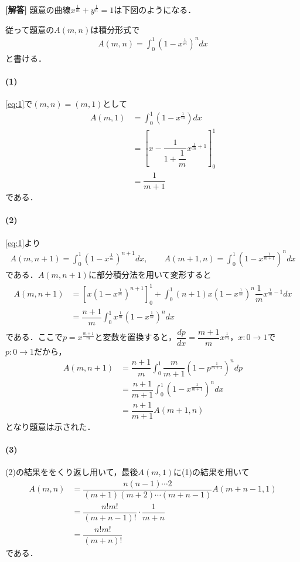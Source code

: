 \documentclass[../../main.tex]{subfiles}
\begin{document}
\begin{oframed}
  
\end{oframed}

{\bf [解答]}
題意の曲線$x^{\frac{1}{m}}+y^{\frac{1}{n}}=1$は下図のようになる．

従って題意の$A(m,n)$は積分形式で
\begin{align}
  A(m,n)=\int_0^1\left(1-x^{\frac{1}{m}}\right)^ndx \label{eq:1}
\end{align}
と書ける．

\paragraph{(1)}

\cref{eq:1}で$(m,n)=(m,1)$として
\begin{align}
  A(m,1)
  &=\int_0^1\left(1-x^{\frac{1}{m}}\right)dx \\
  &=\left[x-\dfrac{1}{1+\dfrac{1}{m}}x^{\frac{1}{m}+1}\right]_0^1 \\
  &=\dfrac{1}{m+1}
\end{align}
である．

\paragraph{(2)}
\cref{eq:1}より
\begin{align}
  A(m,n+1)=\int_0^1\left(1-x^{\frac{1}{m}}\right)^{n+1}dx, \qquad
  A(m+1,n)=\int_0^1\left(1-x^{\frac{1}{m+1}}\right)^ndx \label{eq:2}
\end{align}
である．$A(m,n+1)$に部分積分法を用いて変形すると
\begin{align}
  \begin{split}
    A(m,n+1)
    &=\left[x\left(1-x^{\frac{1}{m}}\right)^{n+1}\right]_0^1+\int_0^1(n+1)x\left(1-x^{\frac{1}{m}}\right)^n\dfrac{1}{m}x^{\frac{1}{m}-1}dx \\
    &=\dfrac{n+1}{m}\int_0^1x^{\frac{1}{m}}\left(1-x^{\frac{1}{m}}\right)^ndx
  \end{split}
\end{align}
である．ここで$p=x^{\frac{m+1}{m}}$と変数を置換すると，$\dfrac{dp}{dx}=\dfrac{m+1}{m}x^{\frac{1}{m}}$，$x:0\to1$で$p:0\to1$だから，
\begin{align}
  A(m,n+1)
  &=\dfrac{n+1}{m}\int_0^1\dfrac{m}{m+1}\left(1-p^{\frac{1}{m+1}}\right)^ndp \\
  &=\dfrac{n+1}{m+1}\int_0^1\left(1-x^{\frac{1}{m+1}}\right)^ndx \\
  &=\dfrac{n+1}{m+1}A(m+1,n)
\end{align}
となり題意は示された．

\paragraph{(3)}

(2)の結果ををくり返し用いて，最後$A(m,1)$に(1)の結果を用いて
\begin{align}
  A(m,n)
  &=\dfrac{n(n-1)\cdots2}{(m+1)(m+2)\cdots(m+n-1)}A(m+n-1,1) \\
  &=\dfrac{n!m!}{(m+n-1)!}\cdot\dfrac{1}{m+n} \\
  &=\dfrac{n!m!}{(m+n)!}
\end{align}
である．
\end{document}
